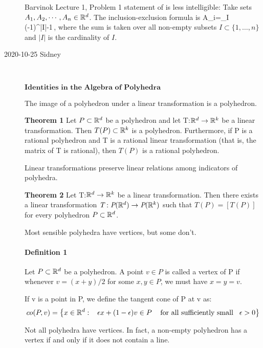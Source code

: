 \begin{description}
Barvinok Lecture 1, Problem 1 statement of
 is less intelligible: Take sets $A_1, A_2,\cdots,
A_n\in\mathbb{R}^d$. The inclusion-exclusion formula is
\beq
\cup A_i=\sum_I (-1)^{|I|-1}
\,,
where the sum is taken over all non-empty subsets
$I\subset \{1,\dots, n\}$
and $|I|$ is the cardinality of $I$.



\item[2020-10-25 Sidney]~

$\textbf{Identities in the Algebra of Polyhedra}$

The image of a polyhedron under a linear transformation is a polyhedron.

\textbf{Theorem 1} Let $P\subset\mathbb{R}^d$ be a polyhedron and let T:$\mathbb{R}^d\rightarrow\mathbb{R}^k$ be a linear transformation. Then $T(P)\subset\mathbb{R}^k$ is a polyhedron. Furthermore, if P is a rational polyhedron and T is a rational linear transformation (that is, the matrix of T is rational), then $T(P)$ is a rational polyhedron.

Linear transformations preserve linear relations among indicators of polyhedra.

\textbf{Theorem 2}
Let T:$\mathbb{R}^d\rightarrow\mathbb{R}^k$ be a linear transformation. Then
there exists a linear transformation
$\textit{T}:\textit{P}(\mathbb{R}^d)\rightarrow\textit{P}(\mathbb{R}^k)$ such
that $\textit{T}(P)=[T(P)]$ for every polyhedron $P\subset\mathbb{R}^d$.

Most sensible polyhedra have vertices, but some don't.

\paragraph{Definition  1} Let $P\subset\mathbb{R}^d$ be a polyhedron.
A point $v\in P$ is called a vertex of P if whenever $v=(x+y)/2$ for some
$x,y\in P$, we must have $x=y=v$.

If v is a point in P, we define the tangent cone of P at v as:
$$co(P,v)=\left\lbrace x\in\mathbb{R}^d:
   \hspace{3mm} \epsilon x+(1-\epsilon)v\in P \hspace{3mm}\mbox{ for all sufficiently small} \hspace{3mm}\epsilon>0\right\rbrace$$

Not all polyhedra have vertices. In fact, a non-empty polyhedron has a vertex if and only if it does not contain a line.


\end{description}
